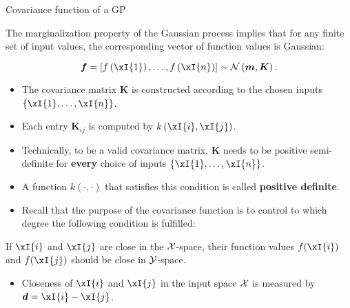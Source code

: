 \begin{frame}[c,allowframebreaks]{Covariance function of a GP}

    The marginalization property of the Gaussian process implies that for any finite set of input values, the corresponding vector of function values is Gaussian:

  $$
    \bm{f} = \left[f\left(\xI{1}\right),\dots, f\left(\xI{n}\right)\right] \sim \mathcal{N}\left(\bm{m}, \bm{K}\right).
  $$ 


\begin{itemize}

  \item The covariance matrix $\bm{K}$ is constructed according to the chosen inputs $\left\{\xI{1},\dots,\xI{n}\right\}$.
  \item Each entry $\bm{K}_{ij}$ is computed by $k\left(\xI{i}, \xI{j}\right)$.
  \item Technically, to be a valid covariance matrix, $\bm{K}$ needs to be positive semi-definite for \textbf{every} choice of inputs $\left\{\xI{1},\dots,\xI{n}\right\}$.
  \item A function $k(\cdot,\cdot)$ that satisfies this condition is called \textbf{positive definite}.
  
\end{itemize}
\framebreak

\begin{itemize}
\item Recall that the purpose of the covariance function is to control to which degree the following condition is fulfilled:
\end{itemize}
\lz
\begin{displayquote}
If $\xI{i}$ and $\xI{j}$ are close in the $\mathcal{X}$-space, their function values $f(\xI{i})$ and $f(\xI{j})$ should be close in $\mathcal{Y}$-space.
\end{displayquote}

\lz
\lz

\begin{itemize}
\item[\faLightbulbO] Closeness of $\xI{i}$ and $\xI{j}$ in the input space $\mathcal{X}$ is measured by $\bm{d} =\xI{i}-\xI{j}$. 


\end{itemize}

\end{frame}

